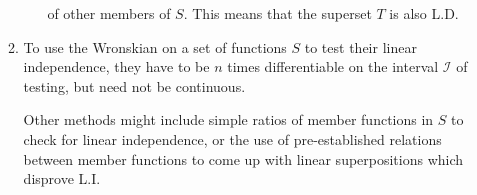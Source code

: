 \begin{enumerate}
\begin{enumerate}
\begin{enumerate}[itemsep = 2em]
                              of other members of $ S $. This means that the superset $ T $ is also L.D.
                    \end{enumerate}
              \item To use the Wronskian on a set of functions $ S $ to test their linear
                    independence, they have to be $ n $ times differentiable on the interval
                    $ \mathcal{I} $ of testing, but need not be continuous.
                    \par Other methods might include simple ratios of member functions in $ S $
                    to check for linear independence, or the use of pre-established relations
                    between member functions to come up with linear superpositions which disprove
                    L.I.
          \end{enumerate}


\end{enumerate}